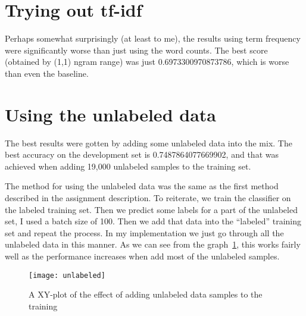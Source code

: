 \section{Trying out tf-idf}
Perhaps somewhat surprisingly (at least to me), the results using term
frequency were significantly worse than just using the word counts. The best
score (obtained by (1,1) ngram range) was just \num{0.6973300970873786}, which
is worse than even the baseline.



\section{Using the unlabeled data}

The best results were gotten by adding some unlabeled data into the mix. The
best accuracy on the development set is \num{0.7487864077669902}, and that was
achieved when adding 19,000 unlabeled samples to the training set.

The method for using the unlabeled data was the same as the first method
described in the assignment description. To reiterate, we train the classifier
on the labeled training set. Then we predict some labels for a part of the
unlabeled set, I used a batch size of 100. Then we add that data into the
``labeled'' training set and repeat the process. In my implementation we just
go through all the unlabeled data in this manner. As we can see from the
graph~\ref{fig:unlabeled}, this works fairly well as the performance increases
when add most of the unlabeled samples.


\begin{figure}[H]
  \centering
  \texttt{[image: unlabeled]}
  \caption{A XY-plot of the effect of adding unlabeled data samples to the
  training}\label{fig:unlabeled}
\end{figure}






















